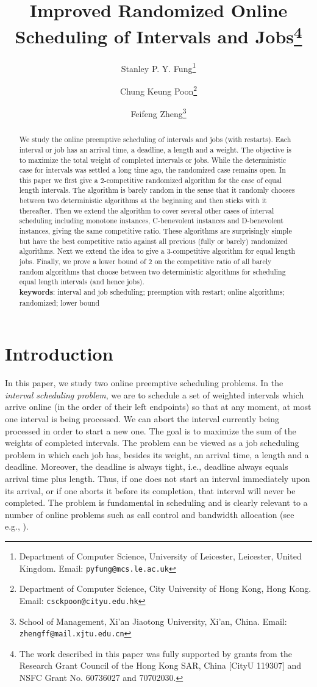 \documentclass[11pt]{article}
\title{{\bf Improved Randomized Online Scheduling of Intervals and Jobs}\thanks{The work described in this paper was fully supported by
grants from the Research Grant Council of the Hong Kong SAR,
China [CityU 119307] and NSFC Grant No. 60736027 and 70702030.}
}
\author{
Stanley P. Y. Fung\footnote{
Department of Computer Science, University of Leicester,
Leicester, United Kingdom. Email: {\tt pyfung@mcs.le.ac.uk}}
\and
Chung Keung Poon\footnote{
Department of Computer Science, City University of Hong Kong, Hong Kong.
Email: {\tt csckpoon@cityu.edu.hk}}
\and
Feifeng Zheng\footnote{
School of Management, Xi'an Jiaotong University, Xi'an, China. 
Email: {\tt zhengff@mail.xjtu.edu.cn}}
}
\begin{document}
\maketitle

\begin{abstract}
We study the online preemptive scheduling of intervals and jobs (with
restarts).  Each interval or job has an arrival time, a deadline,
a length and a weight.  The objective is to maximize the total weight of
completed intervals or jobs.  While the deterministic case for intervals
was settled a long time ago, the randomized case remains open.  In this
paper we first give a 2-competitive randomized algorithm for the case of 
equal length intervals.  The algorithm is barely random in the sense that 
it randomly chooses between two deterministic algorithms at the 
beginning and then sticks with it thereafter.  
Then we extend the algorithm to cover several other cases of interval 
scheduling including monotone instances, C-benevolent instances and 
D-benevolent instances, giving the same competitive ratio.
These algorithms are surprisingly simple but have the best competitive 
ratio against all previous (fully or barely) randomized algorithms.  
Next we extend the idea to give
a 3-competitive algorithm for equal length jobs. 
Finally, we prove a lower bound of 2 on the competitive ratio of all 
barely random algorithms that choose between two deterministic algorithms 
for scheduling equal length intervals (and hence jobs). \\

\noindent
{\bf keywords}: 
interval and job scheduling; preemption with restart;
online algorithms; randomized; lower bound

\end{abstract}

\section{Introduction}

In this paper, we study two online preemptive scheduling problems.
In the {\em interval scheduling problem},
we are to schedule a set of weighted intervals which arrive online
(in the order of their left endpoints)
so that at any moment, at most one interval is being processed.
We can abort the interval currently being processed in order to
start a new one.
The goal is to maximize the sum of the weights of completed
intervals.
The problem can be viewed as a job scheduling problem in which
each job has, besides its weight, an arrival time, a length and a deadline.
Moreover, the deadline is always tight,
i.e., deadline always equals arrival time plus length.
Thus, if one does not start an interval immediately upon its
arrival, or if one aborts it before its completion,
that interval will never be completed.
The problem is fundamental in scheduling and
is clearly relevant to a number of online problems
such as call control and bandwidth allocation
(see e.g., \cite{ABFR94,CanIra98,Woeg94}).
\end{document}

